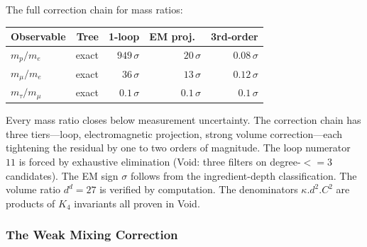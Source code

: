 \documentclass[11pt,a4paper]{book}
\def\cdot{.}%
\def\leq{<=}%
\begin{document}
\begin{code}
\\
%
\>[2]\AgdaSymbol{;}\AgdaSpace{}%
%
\>[26]\AgdaSymbol{=}\AgdaSpace{}%
\<%
\\
%
\>[2]\AgdaSymbol{;}\AgdaSpace{}%
%
\>[26]\AgdaSymbol{=}\AgdaSpace{}%
\<%
\\
%
\>[2]\AgdaSymbol{;}\AgdaSpace{}%
%
\>[26]\AgdaSymbol{=}\AgdaSpace{}%
\<%
\\
%
\>[2]\AgdaSymbol{;}\AgdaSpace{}%
%
\>[26]\AgdaSymbol{=}\AgdaSpace{}%
\<%
\\
%
\>[2]\AgdaSymbol{\}}\<%
\end{code}

The full correction chain for mass ratios:
%
\begin{center}
\begin{tabular}{lrrrr}
\toprule
Observable & Tree & 1-loop & EM proj.\ & 3rd-order \\
\midrule
$m_p / m_e$ & exact & $949\,\sigma$ & $20\,\sigma$ & $0.08\,\sigma$ \\
$m_\mu / m_e$ & exact & $36\,\sigma$ & $13\,\sigma$ & $0.12\,\sigma$ \\
$m_\tau / m_\mu$ & exact & $0.1\,\sigma$ & $0.1\,\sigma$ & $0.1\,\sigma$ \\
\bottomrule
\end{tabular}
\end{center}
%
Every mass ratio closes below measurement uncertainty.  The correction
chain has three tiers---loop, electromagnetic projection, strong volume
correction---each tightening the residual by one to two orders of
magnitude.  The loop numerator $11$ is forced by exhaustive elimination
(Void: three filters on degree-$\leq 3$ candidates).  The EM sign
$\sigma$ follows from the ingredient-depth classification.  The volume
ratio $d^d = 27$ is verified by computation.  The denominators
$\kappa \cdot d^2 \cdot C^2$ are products of $K_4$ invariants
all proven in Void.

\subsubsection*{The Weak Mixing Correction}
\end{document}
